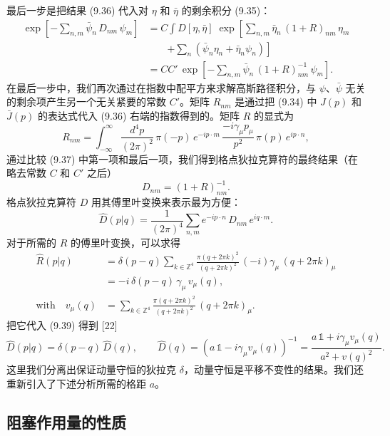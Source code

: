 最后一步是把结果 (9.36) 代入对 $\eta$ 和 $\bar\eta$ 的剩余积分 (9.35)：
\begin{align}
  \exp\!\left[-\sum_{n,m}\bar\psi_n\,D_{nm}\,\psi_m\right]
  &= C\int D[\eta,\bar\eta]\;
     \exp\!\left[\sum_{n,m}\bar\eta_n\,(1+R)_{nm}\,\eta_m\right. \nonumber\\
  &\qquad \left.+ \sum_n\left(\bar\psi_n\eta_n + \bar\eta_n\psi_n\right)\right] \nonumber\\
  &= CC'\,\exp\!\left[-\sum_{n,m}\bar\psi_n\,(1+R)^{-1}_{nm}\,\psi_m\right] .
\end{align}
在最后一步中，我们再次通过在指数中配平方来求解高斯路径积分，与 $\psi$、$\bar\psi$ 无关的剩余项产生另一个无关紧要的常数 $C'$。矩阵 $R_{nm}$ 是通过把 (9.34) 中 $J(p)$ 和 $\bar J(p)$ 的表达式代入 (9.36) 右端的指数得到的。矩阵 $R$ 的显式为
\begin{equation}
  R_{nm} = \int_{-\infty}^{\infty}\frac{d^4p}{(2\pi)^2}\,
    \pi(-p)\,e^{-ip\cdot m}\,\frac{-i\gamma_\mu p_\mu}{p^2}\,\pi(p)\,e^{ip\cdot n} ,
\end{equation}
通过比较 (9.37) 中第一项和最后一项，我们得到格点狄拉克算符的最终结果（在略去常数 $C$ 和 $C'$ 之后）
\begin{equation}
  D_{nm} = (1+R)^{-1}_{nm} .
\end{equation}
格点狄拉克算符 $D$ 用其傅里叶变换来表示最为方便：
\begin{equation}
  \hat D(p|q) = \frac{1}{(2\pi)^4}\sum_{n,m}e^{-ip\cdot n}\,D_{nm}\,e^{iq\cdot m} .
\end{equation}
对于所需的 $R$ 的傅里叶变换，可以求得
\begin{align}
  \hat R(p|q)
  &= \delta(p-q)\sum_{k\in\mathbb{Z}^4}
     \frac{\pi(q+2\pi k)^2}{(q+2\pi k)^2}\,(-i)\gamma_\mu\,(q+2\pi k)_\mu \nonumber\\
  &= -i\,\delta(p-q)\,\gamma_\mu\,v_\mu(q) , \nonumber\\
  \text{with}\quad v_\mu(q)
  &= \sum_{k\in\mathbb{Z}^4}
     \frac{\pi(q+2\pi k)^2}{(q+2\pi k)^2}\,(q+2\pi k)_\mu .
\end{align}
把它代入 (9.39) 得到 [22]
\begin{equation}
  \hat D(p|q) = \delta(p-q)\,\hat D(q) , \qquad
  \hat D(q) = \left(a\,\mathbb{1} - i\gamma_\mu v_\mu(q)\right)^{-1}
    = \frac{a\,\mathbb{1} + i\gamma_\mu v_\mu(q)}{a^2 + v(q)^2} .
\end{equation}
这里我们分离出保证动量守恒的狄拉克 $\delta$，动量守恒是平移不变性的结果。我们还重新引入了下述分析所需的格距 $a$。

\subsection{阻塞作用量的性质}
\label{sec:9.2.3}

